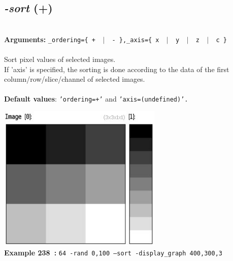 \documentclass[a4paper,11pt,twoside]{book}
\begin{document}
\subsection{\emph{-sort} (+)}\vspace*{-0.5em}
~\\\textbf{Arguments: } 
{\small \texttt{\_ordering=\{ + ~$|$~ - \},\_axis=\{ x ~$|$~ y ~$|$~ z ~$|$~ c \}}}\\~\\
Sort pixel values of selected images.
~\\If 'axis' is specified, the sorting is done according to the data of the first column/row/slice/channel
of selected images.
~\\~\\\textbf{Default values}: {\small \texttt{'ordering=+'} and \texttt{'axis=(undefined)'.}}
\begin{center}\includegraphics[keepaspectratio=true,height=7cm,width=\textwidth]{img/gmic_def238.jpg}\\
{\footnotesize \textbf{Example 238~:} \texttt{64 -rand 0,100 --sort -display\_graph 400,300,3}}
\end{center}
\end{document}
